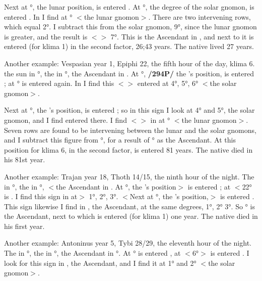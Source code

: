 Next at \Capricorn\xspace 17°, the lunar position, is entered \Taurus. At \Taurus\xspace 9°, the degree of the solar gnomon, is entered \Virgo. In \Pisces\xspace I find \Virgo\xspace at \Pisces\xspace 15° $<$the lunar gnomon$>$. There are two intervening rows, which equal 2°. I subtract this from the solar gnomon, 9°, since the lunar gnomon is greater, and the result is $<$\Pisces$>$ 7°. This is the Ascendant in \Pisces, and next to it is entered (for klima 1) in the second factor, 26;43 years. The native lived 27 years.

Another example: Vespasian year 1, Epiphi 22, the fifth hour of the day, klima 6. the sun in \Cancer\xspace 28°, the \Moon\xspace in \Scorpio\xspace 3°, the Ascendant in \Libra. At \Cancer\xspace 28°, \textbf{/294P/} the \Sun’s position, is entered \Aquarius; at \Aquarius\xspace 28° is entered \Aquarius\xspace again. In \Libra\xspace I find this $<$\Aquarius$>$ entered at 4°, 5°, 6°
$<$the solar gnomon$>$. 

Next at \Scorpio\xspace 3°, the \Moon’s position, is entered \Scorpio; so in this sign I look at 4° and 5°, the solar gnomon, and I find \Capricorn\xspace entered there. I find $<$\Capricorn$>$ in \Libra\xspace at \Libra\xspace 22° $<$the lunar gnomon$>$. Seven rows are found to be intervening between the lunar and the solar
gnomons, and I subtract this figure from \Libra\xspace 4°, for a result of \Virgo\xspace 27° as the Ascendant. At this position for klima 6, in the second factor, is entered 81 years. The native died in his 81st year. 

Another example: Trajan year 18, Thoth 14/15, the ninth hour of the night. The \Sun\xspace in \Virgo\xspace 22°, the \Moon\xspace in \Aquarius\xspace 4°, $<$the Ascendant in \Leo. At \Virgo\xspace 22°, the \Sun’s position$>$ is entered \Cancer; at \Cancer\xspace $<$22° is \Sagittarius. I find this sign in \Leo\xspace at$>$ 1°, 2°, 3°. $<$Next at \Aquarius\xspace 4°, the \Moon’s position,$>$ is entered \Sagittarius. This sign likewise I find in \Leo, the Ascendant, at the same degrees, 1°, 2° 3°. So \Leo\xspace 1° is the Ascendant, next to which is entered (for klima 1) one year. The native died in his first year.

Another example: Antoninus year 5, Tybi 28/29, the eleventh hour of the night. The \Sun\xspace in \Aquarius\xspace 6°, the \Moon\xspace in \Taurus\xspace 28°, the Ascendant in \Capricorn\xspace 6°. At \Aquarius\xspace 6° is entered \Virgo, at \Virgo\xspace 
$<$6°$>$ is entered \Cancer. I look for this sign in \Capricorn, the Ascendant, and I find it at 1° and 2° $<$the solar gnomon$>$. 

